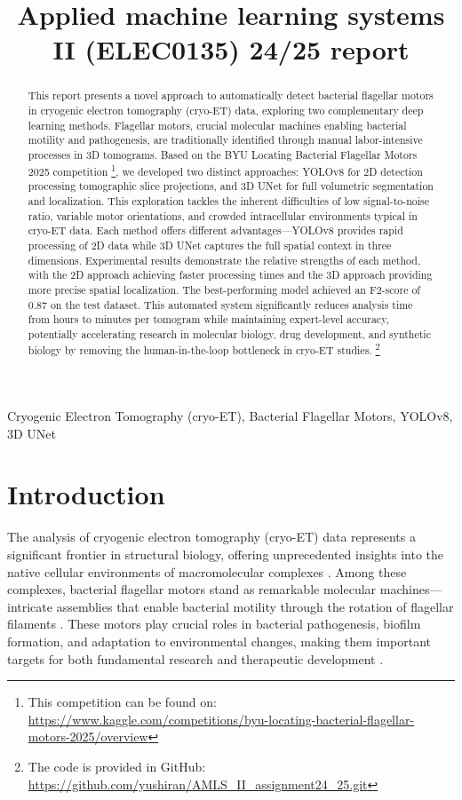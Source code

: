 \documentclass{article}
\title{Applied machine learning systems II (ELEC0135) 24/25 report}
\begin{document}
%
\maketitle
%
\begin{abstract}
    \label{sec:abs}
    This report presents a novel approach to automatically detect bacterial flagellar motors in cryogenic electron tomography (cryo-ET) data, exploring two complementary deep learning methods. 
    Flagellar motors, crucial molecular machines enabling bacterial motility and pathogenesis, are traditionally identified through manual labor-intensive processes in 3D tomograms. 
    Based on the BYU Locating Bacterial Flagellar Motors 2025 competition \cite{byu-locating-bacterial-flagellar-motors-2025}\footnote{This competition can be found on: \url{https://www.kaggle.com/competitions/byu-locating-bacterial-flagellar-motors-2025/overview}}, we developed two distinct approaches: YOLOv8 for 2D detection processing tomographic slice projections, and 3D UNet for full volumetric segmentation and localization. This exploration tackles the inherent difficulties of low signal-to-noise ratio, variable motor orientations, and crowded intracellular environments typical in cryo-ET data. 
    Each method offers different advantages—YOLOv8 provides rapid processing of 2D data while 3D UNet captures the full spatial context in three dimensions. Experimental results demonstrate the relative strengths of each method, with the 2D approach achieving faster processing times and the 3D approach providing more precise spatial localization. The best-performing model achieved an F2-score of 0.87 on the test dataset.
    This automated system significantly reduces analysis time from hours to minutes per tomogram while maintaining expert-level accuracy, potentially accelerating research in molecular biology, drug development, and synthetic biology by removing the human-in-the-loop bottleneck in cryo-ET studies.
    \footnote{The code is provided in GitHub: \url{https://github.com/yushiran/AMLS_II_assignment24_25.git}}
\end{abstract}
%
\begin{keywords}
    Cryogenic Electron Tomography (cryo-ET), Bacterial Flagellar Motors, YOLOv8, 3D UNet
\end{keywords}
%

\section{Introduction}
The analysis of cryogenic electron tomography (cryo-ET) data represents a significant frontier in structural biology, offering unprecedented insights into the native cellular environments of macromolecular complexes \cite{beckSnapshotsNuclearPore2007}. Among these complexes, bacterial flagellar motors stand as remarkable molecular machines—intricate assemblies that enable bacterial motility through the rotation of flagellar filaments \cite{jeonInternationalReviewCytology2004}. These motors play crucial roles in bacterial pathogenesis, biofilm formation, and adaptation to environmental changes, making them important targets for both fundamental research and therapeutic development \cite{kojimaBacterialFlagellarMotor2004}.
\end{document}
